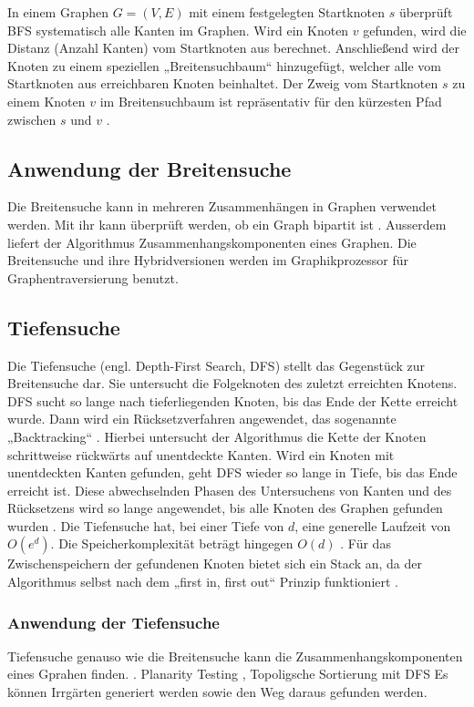 In einem Graphen $G = (V, E)$ mit einem festgelegten Startknoten $s$ überprüft BFS systematisch alle Kanten im Graphen. Wird ein Knoten $v$ gefunden, wird die Distanz (Anzahl Kanten) vom Startknoten aus berechnet. Anschließend wird der Knoten zu einem speziellen „Breitensuchbaum“ hinzugefügt, welcher alle vom Startknoten aus erreichbaren Knoten beinhaltet. Der Zweig vom Startknoten $s$ zu einem Knoten $v$ im Breitensuchbaum ist repräsentativ für den kürzesten Pfad zwischen $s$ und $v$ \cite{Cormen.2009}.

\subsection{Anwendung der Breitensuche}
Die Breitensuche kann in mehreren Zusammenhängen in Graphen verwendet werden.  Mit ihr kann überprüft werden, ob ein Graph bipartit ist \cite{propTest}. Ausserdem liefert der Algorithmus Zusammenhangskomponenten eines Graphen\cite{schmitz}. Die Breitensuche und ihre Hybridversionen\cite{effHyb} werden im Graphikprozessor für Graphentraversierung benutzt\cite{scaleGPU}. 

\subsection{Tiefensuche}

Die Tiefensuche (engl. Depth-First Search, DFS) stellt das Gegenstück zur Breitensuche dar. Sie untersucht die Folgeknoten des zuletzt erreichten Knotens. DFS sucht so lange nach tieferliegenden Knoten, bis das Ende der Kette erreicht wurde. Dann wird ein Rücksetzverfahren angewendet, das sogenannte „Backtracking“ \cite{Tarjan.1972}. Hierbei untersucht der Algorithmus die Kette der Knoten schrittweise rückwärts auf unentdeckte Kanten. Wird ein Knoten mit unentdeckten Kanten gefunden, geht DFS wieder so lange in Tiefe, bis das Ende erreicht ist. Diese abwechselnden Phasen des Untersuchens von Kanten und des Rücksetzens wird so lange angewendet, bis alle Knoten des Graphen gefunden wurden \cite{Cormen.2009}. Die Tiefensuche hat, bei einer Tiefe von $d$, eine generelle Laufzeit von $O(e^d)$. Die Speicherkomplexität beträgt hingegen $O(d)$ \cite{Korf.1985}. Für das Zwischenspeichern der gefundenen Knoten bietet sich ein Stack an, da der Algorithmus selbst nach dem „first in, first out“ Prinzip funktioniert \cite{Tarjan.1972}.  


\subsubsection{Anwendung der Tiefensuche}
Tiefensuche genauso wie die Breitensuche kann die Zusammenhangskomponenten eines Gprahen finden. \cite{schmitz} \cite{dfs}.  Planarity Testing \cite{dfsPlanar}, Topoligsche Sortierung mit DFS
Es können Irrgärten generiert werden sowie den Weg daraus gefunden werden\cite{examMaze}.


